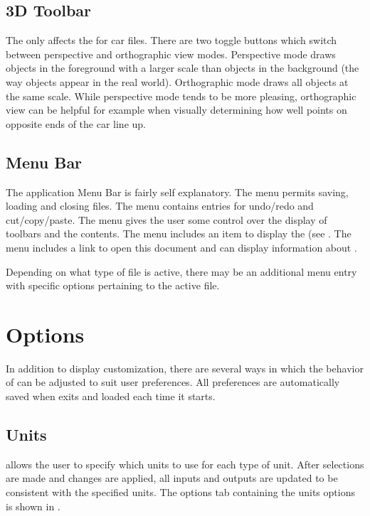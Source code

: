 \subsection{3D Toolbar} \label{ssec:3DToolbar}

The  only affects the  for car files.  There are two toggle buttons which switch between perspective and orthographic view modes.  Perspective mode draws objects in the foreground with a larger scale than objects in the background (the way objects appear in the real world).  Orthographic mode draws all objects at the same scale.  While perspective mode tends to be more pleasing, orthographic view can be helpful for example when visually determining how well points on opposite ends of the car line up.

\subsection{Menu Bar} \label{ssec:menuBar}

The application Menu Bar is fairly self explanatory.  The  menu permits saving, loading and closing files.  The  menu contains entries for undo/redo and cut/copy/paste.  The  menu gives the user some control over the display of toolbars and the  contents.  The  menu includes an item to display the  (see .  The  menu includes a link to open this document and can display information about \vvase{}.

Depending on what type of file is active, there may be an additional menu entry with specific options pertaining to the active file.

\section{Options} \label{sec:options}

In addition to display customization, there are several ways in which the behavior of \vvase{} can be adjusted to suit user preferences.  All preferences are automatically saved when \vvase{} exits and loaded each time it starts.

\subsection{Units} \label{ssec:optionsUnits}

\vvase{} allows the user to specify which units to use for each type of unit.  After selections are made and changes are applied, all inputs and outputs are updated to be consistent with the specified units.  The options tab containing the units options is shown in .

